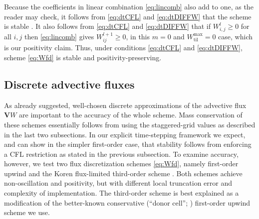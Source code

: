 \documentclass[gmd]{copernicus}   %
\newcommand{\text}{\textrm}
\newcommand\bV{\mathbf{V}}
\newcommand{\Wtilmax}{W_{\text{til}}^{\text{max}}}
\newcommand{\Wlij}{W^l_{i,j}}
\begin{document}
Because the coefficients in linear combination \eqref{eq:lincomb} also add to one, as the reader may check, it follows  from \eqref{eq:dtCFL} and \eqref{eq:dtDIFFW} that the scheme is stable \citep{MortonMayers}.  It also follows from \eqref{eq:dtCFL} and \eqref{eq:dtDIFFW} that if $\Wlij\ge 0$ for all $i,j$ then \eqref{eq:lincomb} gives $W_{ij}^{l+1}\ge 0$, in this $m=0$ and $\Wtilmax=0$ case, which is our positivity claim.  Thus, under conditions \eqref{eq:dtCFL} and \eqref{eq:dtDIFFW}, scheme \eqref{eq:Wfd} is stable and positivity-preserving.


\subsection{Discrete advective fluxes}  \label{subsect:discretefluxes}  As already suggested, well-chosen discrete approximations of the advective flux $\bV W$ are important to the accuracy of the whole scheme.  Mass conservation of these schemes essentially follows from using the staggered-grid values as described in the last two subsections.  In our explicit time-stepping framework we expect, and can show in the simpler first-order case, that stability follows from enforcing a CFL restriction as stated in the previous subsection.  To examine accuracy, however, we test two flux discretization schemes \eqref{eq:Wfd}, namely first-order upwind and the Koren flux-limited third-order scheme \citep{HundsdorferVerwer2010}.  Both schemes achieve non-oscillation and positivity, but with different local truncation error and complexity of implementation.  The third-order scheme is best explained as a modification of the better-known conservative (``donor cell''; \cite{LeVeque}) first-order upwind scheme we use.
\end{document}
